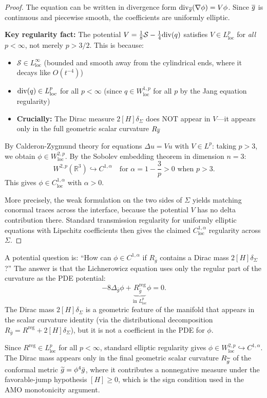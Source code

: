 \begin{proof}
The equation can be written in divergence form $\mathrm{div}_{\overline{g}}(\nabla \phi) = V \phi$. Since $\overline{g}$ is continuous and piecewise smooth, the coefficients are uniformly elliptic. 

\textbf{Key regularity fact:} The potential $V = \frac{1}{8}\mathcal{S} - \frac{1}{4}\mathrm{div}(q)$ satisfies $V \in L^p_{\text{loc}}$ for \emph{all} $p < \infty$, not merely $p > 3/2$. This is because:
\begin{itemize}
    \item $\mathcal{S} \in L^\infty_{\text{loc}}$ (bounded and smooth away from the cylindrical ends, where it decays like $O(t^{-4})$)
    \item $\mathrm{div}(q) \in L^p_{\text{loc}}$ for all $p < \infty$ (since $q \in W^{1,p}_{\text{loc}}$ for all $p$ by the Jang equation regularity)
    \item \textbf{Crucially:} The Dirac measure $2[H]\delta_\Sigma$ does NOT appear in $V$---it appears only in the full geometric scalar curvature $R_{\overline{g}}$
\end{itemize}

By Calderon-Zygmund theory for equations $\Delta u = Vu$ with $V \in L^p$: taking $p > 3$, we obtain $\phi \in W^{2,p}_{\text{loc}}$. By the Sobolev embedding theorem in dimension $n = 3$:
\[
W^{2,p}(\mathbb{R}^3) \hookrightarrow C^{1,\alpha} \quad \text{for } \alpha = 1 - \frac{3}{p} > 0 \text{ when } p > 3.
\]
This gives $\phi \in C^{1,\alpha}_{\text{loc}}$ with $\alpha > 0$.

More precisely, the weak formulation on the two sides of $\Sigma$ yields matching conormal traces across the interface, because the potential $V$ has no delta contribution there. Standard transmission regularity for uniformly elliptic equations with Lipschitz coefficients then gives the claimed $C^{1,\alpha}_{\mathrm{loc}}$ regularity across $\Sigma$.
\end{proof}

\begin{remark}
A potential question is: ``How can $\phi \in C^{1,\alpha}$ if $R_{\bar{g}}$ contains a Dirac mass $2[H]\delta_\Sigma$?'' The answer is that the Lichnerowicz equation uses only the regular part of the curvature as the PDE potential:
\[
-8\Delta_{\bar{g}}\phi + \underbrace{R^{\mathrm{reg}}_{\bar{g}}}_{\text{in }L^p_{\text{loc}}} \phi = 0.
\]
The Dirac mass $2[H]\delta_\Sigma$ is a geometric feature of the manifold that appears in the scalar curvature identity (via the distributional decomposition $R_{\bar{g}} = R^{\mathrm{reg}} + 2[H]\delta_\Sigma$), but it is not a coefficient in the PDE for $\phi$.

Since $R^{\mathrm{reg}} \in L^p_{\text{loc}}$ for all $p < \infty$, standard elliptic regularity gives $\phi \in W^{2,p}_{\text{loc}} \hookrightarrow C^{1,\alpha}$. The Dirac mass appears only in the final geometric scalar curvature $R_{\widetilde{g}}$ of the conformal metric $\widetilde{g} = \phi^4\bar{g}$, where it contributes a nonnegative measure under the favorable-jump hypothesis $[H] \ge 0$, which is the sign condition used in the AMO monotonicity argument.
\end{remark}

